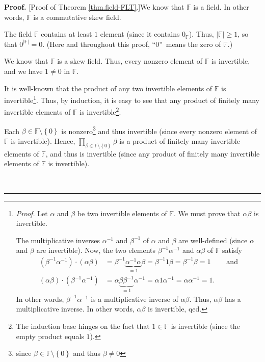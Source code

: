 \documentclass[numbers=enddot,12pt,final,onecolumn,notitlepage]{scrartcl}%
\theoremstyle{definition}
\newenvironment{proof}[1][Proof]{\noindent\textbf{#1.} }{\ \rule{0.5em}{0.5em}}
\let\prodnonlimits\prod
\renewcommand{\prod}{\prodnonlimits\limits}
\begin{document}
\begin{proof}
[Proof of Theorem \ref{thm.field-FLT}.]We know that $\mathbb{F}$ is a field.
In other words, $\mathbb{F}$ is a commutative skew field.

The field $\mathbb{F}$ contains at least $1$ element (since it contains
$0_{\mathbb{F}}$). Thus, $\left\vert \mathbb{F}\right\vert \geq1$, so that
$0^{\left\vert \mathbb{F}\right\vert }=0$. (Here and throughout this proof,
\textquotedblleft$0$\textquotedblright\ means the zero of $\mathbb{F}$.)

We know that $\mathbb{F}$ is a skew field. Thus, every nonzero element of
$\mathbb{F}$ is invertible, and we have $1\neq0$ in $\mathbb{F}$.

It is well-known that the product of any two invertible elements of
$\mathbb{F}$ is invertible\footnote{\textit{Proof.} Let $\alpha$ and $\beta$
be two invertible elements of $\mathbb{F}$. We must prove that $\alpha\beta$
is invertible.
\par
The multiplicative inverses $\alpha^{-1}$ and $\beta^{-1}$ of $\alpha$ and
$\beta$ are well-defined (since $\alpha$ and $\beta$ are invertible). Now, the
two elements $\beta^{-1}\alpha^{-1}$ and $\alpha\beta$ of $\mathbb{F}$ satisfy%
\begin{align*}
\left(  \beta^{-1}\alpha^{-1}\right)  \cdot\left(  \alpha\beta\right)   &
=\beta^{-1}\underbrace{\alpha^{-1}\alpha}_{=1}\beta=\beta^{-1}1\beta
=\beta^{-1}\beta=1\ \ \ \ \ \ \ \ \ \ \text{and}\\
\left(  \alpha\beta\right)  \cdot\left(  \beta^{-1}\alpha^{-1}\right)   &
=\alpha\underbrace{\beta\beta^{-1}}_{=1}\alpha^{-1}=\alpha1\alpha^{-1}%
=\alpha\alpha^{-1}=1.
\end{align*}
In other words, $\beta^{-1}\alpha^{-1}$ is a multiplicative inverse of
$\alpha\beta$. Thus, $\alpha\beta$ has a multiplicative inverse. In other
words, $\alpha\beta$ is invertible, qed.}. Thus, by induction, it is easy to
see that any product of finitely many invertible elements of $\mathbb{F}$ is
invertible\footnote{The induction base hinges on the fact that $1\in
\mathbb{F}$ is invertible (since the empty product equals $1$).}.

Each $\beta\in\mathbb{F}\setminus\left\{  0\right\}  $ is
nonzero\footnote{since $\beta\in\mathbb{F}\setminus\left\{  0\right\}  $ and
thus $\beta\neq0$} and thus invertible (since every nonzero element of
$\mathbb{F}$ is invertible). Hence, $\prod_{\beta\in\mathbb{F}\setminus
\left\{  0\right\}  }\beta$ is a product of finitely many invertible elements
of $\mathbb{F}$, and thus is invertible (since any product of finitely many
invertible elements of $\mathbb{F}$ is invertible).


\end{proof}
\end{document}
